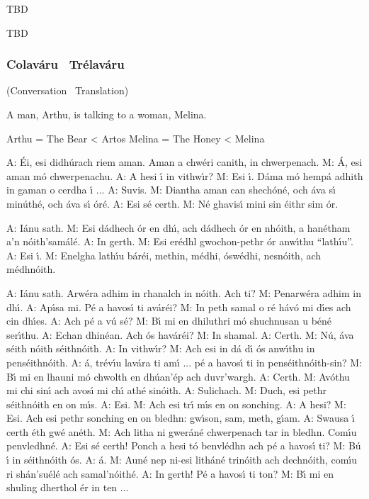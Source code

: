 \begingroup
\fontsize{10pt}{12pt}\selectfont
\begin{leftbubbles}TBD\end{leftbubbles}
\begin{rightbubbles}TBD\end{rightbubbles}
\endgroup

\newpage
\subsubsection{Colav\'{a}ru \textendash\ Tr\'{e}lav\'{a}ru}
(Conversation \textendash\ Translation)

A man, Arthu, is talking to a woman, Melina.

Arthu = The Bear < Artos
Melina = The Honey < Melina

A: \'{E}i, esi didh\'{u}rach riem aman. Aman a chw\'{e}ri canith, in chwerpenach.
M: \'{A}, esi aman m\'{o} chwerpenachu. 
A: A hesi \'{\i} in vithw\'{\i}r?
M: Esi \'{\i}. D\'{a}ma m\'{o} hemp\'{a} adhith in gaman o cerdha \'{\i} ...
A: Suvis.
M: Diantha aman can shech\'{o}n\'{e}, och \'{a}va s\'{\i} min\'{u}th\'{e}, och \'{a}va s\'{\i} \'{o}r\'{e}.
A: Esi s\'{e} certh.
M: N\'{e} ghavis\'{\i} mini sin \'{e}ithr sim \'{o}r.

A: I\'{a}nu sath.
M: Esi d\'{a}dhech \'{o}r en dh\'{\i}, ach d\'{a}dhech \'{o}r en nh\'{o}ith, a han\'{e}tham a’n n\'{o}ith’sam\'{a}l\'{e}.
A: In gerth.
M: Esi er\'{e}dhl gwochon-pethr \'{o}r anw\'{\i}thu “lath\'{\i}u”.
A: Esi \'{\i}.
M: Enelgha lath\'{\i}u b\'{a}r\'{e}i, methin, m\'{e}dhi, \'{o}sw\'{e}dhi, nesn\'{o}ith, ach m\'{e}dhn\'{o}ith.

A: I\'{a}nu sath. Arw\'{e}ra adhim in rhanalch in n\'{o}ith. Ach ti?
M: Penarw\'{e}ra adhim in dh\'{\i}.
A: Ap\'{\i}sa mi. P\'{e} a havos\'{\i} ti av\'{a}r\'{e}i?
M: In peth samal o r\'{e} h\'{a}v\'{o} mi d\'{\i}es ach cin dh\'{\i}es.
A: Ach p\'{e} a v\'{u} s\'{e}?
M: B\'{\i} mi en dhiluthri m\'{o} shuchnusan u b\'{e}n\'{e} ser\'{\i}thu.
A: Echan dhin\'{e}an. Ach \'{o}s hav\'{a}r\'{e}i?
M: In shamal.
A: Certh.
M: N\'{u}, \'{a}va s\'{e}ith n\'{o}ith s\'{e}ithn\'{o}ith.
A: In vithw\'{\i}r?
M: Ach esi in d\'{a} d\'{\i} \'{o}s anw\'{\i}thu in pens\'{e}ithn\'{o}ith.
A: \'{a}, tr\'{e}v\'{\i}u lav\'{a}ra ti am\'{\i} ... p\'{e} a havos\'{\i} ti in pens\'{e}ithn\'{o}ith-sin?
M: B\'{\i} mi en lhauni m\'{o} chwolth en dh\'{u}an’\'{e}p ach duvr’wargh.
A: Certh.
M: Av\'{o}thu mi chi sin\'{\i} ach avos\'{\i} mi ch\'{\i} ath\'{e} sin\'{o}ith.
A: Sulichach.
M: Duch, esi pethr s\'{e}ithn\'{o}ith en on m\'{\i}s.
A: Esi.
M: Ach esi tr\'{\i} m\'{\i}s en on sonching.
A: A hesi?
M: Esi. Ach esi pethr sonching en on bledhn: gw\'{\i}son, sam, meth, g\'{\i}am.
A: Swausa \'{\i} certh \'{e}th gw\'{e} an\'{e}th.
M: Ach litha ni gwer\'{a}n\'{e} chwerpenach tar in bledhn. Com\'{\i}u penvledhn\'{e}.
A: Esi s\'{e} certh! Ponch a hesi t\'{o} benvl\'{e}dhn ach p\'{e} a havos\'{\i} ti?
M: B\'{u} \'{\i} in s\'{e}ithn\'{o}ith \'{o}s.
A: \'{a}.
M: Aun\'{e} nep ni-esi lith\'{a}n\'{e} trin\'{o}ith ach dechn\'{o}ith, com\'{\i}u ri sh\'{a}n’su\'{e}l\'{e} ach samal’n\'{o}ith\'{e}.
A: In gerth! P\'{e} a havos\'{\i} ti ton?
M: B\'{\i} mi en shuling dherthol \'{e}r in ten ...

